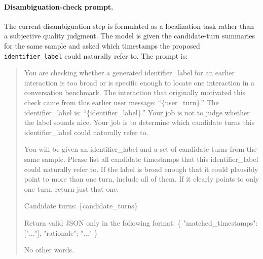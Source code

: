 \paragraph{Disambiguation-check prompt.}
The current disambiguation step is formulated as a localization task rather than a subjective quality judgment. The model is given the candidate-turn summaries for the same sample and asked which timestamps the proposed \texttt{identifier\_label} could naturally refer to. The prompt is:
\begin{quote}
\small
You are checking whether a generated identifier\_label for an earlier interaction is too broad or is specific enough to locate one interaction in a conversation benchmark. The interaction that originally motivated this check came from this earlier user message: ``\{user\_turn\}.'' The identifier\_label is: ``\{identifier\_label\}.'' Your job is not to judge whether the label sounds nice. Your job is to determine which candidate turns this identifier\_label could naturally refer to.

You will be given an identifier\_label and a set of candidate turns from the same sample. Please list all candidate timestamps that this identifier\_label could naturally refer to. If the label is broad enough that it could plausibly point to more than one turn, include all of them. If it clearly points to only one turn, return just that one.

Candidate turns:
\{candidate\_turns\}

Return valid JSON only in the following format:
\{
  "matched\_timestamps": ["..."],
  "rationale": "..."
\}

No other words.
\normalsize
\end{quote}

